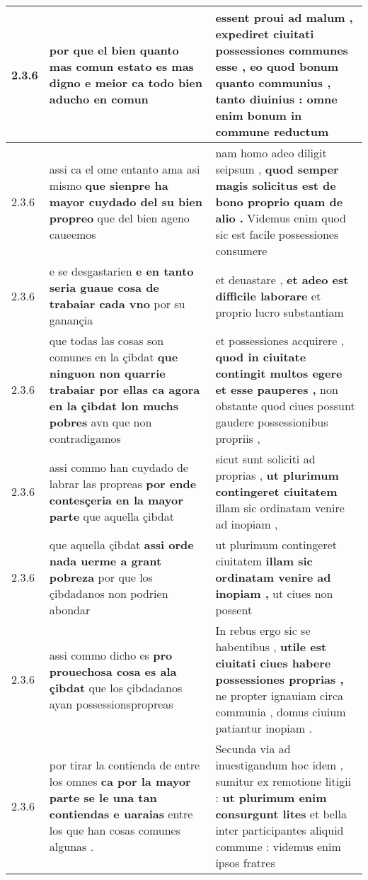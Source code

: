 \begin{tabular}{|p{1cm}|p{6.5cm}|p{6.5cm}|}
2.3.6 & por que el bien \textbf{ quanto mas comun estato es mas digno e meior } ca todo bien aducho en comun & essent proui ad malum , expediret ciuitati possessiones communes esse , eo quod bonum quanto communius , \textbf{ tanto diuinius : } omne enim bonum in commune reductum \\\hline
2.3.6 & assi ca el ome entanto ama asi mismo \textbf{ que sienpre ha mayor cuydado del su bien propreo } que del bien ageno caueemos & nam homo adeo diligit seipsum , \textbf{ quod semper magis solicitus est de bono proprio quam de alio . } Videmus enim quod sic est facile possessiones consumere \\\hline
2.3.6 & e se desgastarien \textbf{ e en tanto seria guaue cosa de trabaiar cada vno } por su ganançia & et deuastare , \textbf{ et adeo est difficile laborare } et proprio lucro substantiam \\\hline
2.3.6 & que todas las cosas son comunes en la çibdat \textbf{ que ninguon non quarrie trabaiar por ellas ca agora en la çibdat lon muchs pobres } avn que non contradigamos & et possessiones acquirere , \textbf{ quod in ciuitate contingit multos egere et esse pauperes , } non obstante quod ciues possunt gaudere possessionibus propriis , \\\hline
2.3.6 & assi commo han cuydado de labrar las propreas \textbf{ por ende contesçeria en la mayor parte } que aquella çibdat & sicut sunt soliciti ad proprias , \textbf{ ut plurimum contingeret ciuitatem } illam sic ordinatam venire ad inopiam , \\\hline
2.3.6 & que aquella çibdat \textbf{ assi orde nada uerme a grant pobreza } por que los çibdadanos non podrien abondar & ut plurimum contingeret ciuitatem \textbf{ illam sic ordinatam venire ad inopiam , } ut ciues non possent \\\hline
2.3.6 & assi commo dicho es \textbf{ pro prouechosa cosa es ala çibdat } que los çibdadanos ayan possessionspropreas & In rebus ergo sic se habentibus , \textbf{ utile est ciuitati ciues habere possessiones proprias , } ne propter ignauiam circa communia , domus ciuium patiantur inopiam . \\\hline
2.3.6 & por tirar la contienda de entre los omnes \textbf{ ca por la mayor parte se le una tan contiendas e uaraias } entre los que han cosas comunes algunas . & Secunda via ad inuestigandum hoc idem , sumitur ex remotione litigii : \textbf{ ut plurimum enim consurgunt lites } et bella inter participantes aliquid commune : videmus enim ipsos fratres \\\hline

\end{tabular}
